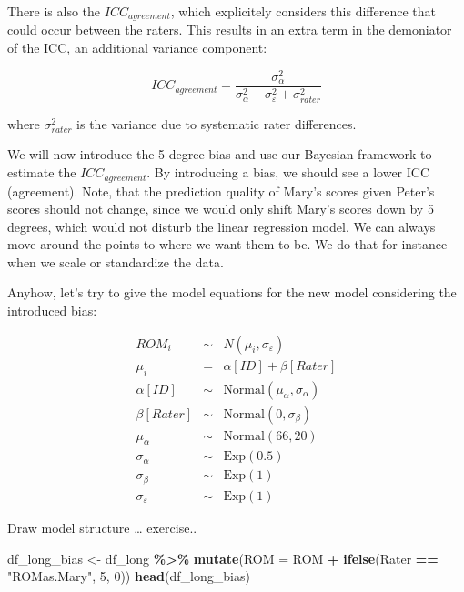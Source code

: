 \documentclass[
]{book}
\newenvironment{Shaded}{\begin{snugshade}}{\end{snugshade}}
\newcommand{\AttributeTok}[1]{\textcolor[rgb]{0.13,0.29,0.53}{#1}}
\newcommand{\DecValTok}[1]{\textcolor[rgb]{0.00,0.00,0.81}{#1}}
\newcommand{\FunctionTok}[1]{\textcolor[rgb]{0.13,0.29,0.53}{\textbf{#1}}}
\newcommand{\NormalTok}[1]{#1}
\newcommand{\OtherTok}[1]{\textcolor[rgb]{0.56,0.35,0.01}{#1}}
\newcommand{\SpecialCharTok}[1]{\textcolor[rgb]{0.81,0.36,0.00}{\textbf{#1}}}
\newcommand{\StringTok}[1]{\textcolor[rgb]{0.31,0.60,0.02}{#1}}
\begin{document}
There is also the \textbf{\(ICC_{agreement}\)}, which explicitely considers this difference
that could occur between the raters. This results in an extra term in the demoniator
of the ICC, an additional variance component:

\[ ICC_{agreement} = \frac{\sigma_{\alpha}^2}{\sigma_{\alpha}^2 + 
\sigma_{\varepsilon}^2 + \sigma_{rater}^2}\]

where \(\sigma_{rater}^2\) is the variance due to systematic rater differences.

We will now introduce the 5 degree bias and use our Bayesian
framework to estimate the \(ICC_{agreement}\). By introducing a bias, we should see
a lower ICC (agreement). Note, that the prediction quality of Mary's scores
given Peter's scores should not change, since we would only shift Mary's scores
down by 5 degrees, which would not disturb the linear regression model. We can
always move around the points to where we want them to be. We do that for instance
when we scale or standardize the data.

Anyhow, let's try to give the model equations for the new model considering
the introduced bias:

\[
\begin{array}{rcl}
ROM_i &\sim& N(\mu_i, \sigma_{\varepsilon}) \\
\mu_i &=& \alpha[ID] + \beta[Rater] \\
\alpha[ID] &\sim& \text{Normal}(\mu_{\alpha}, \sigma_{\alpha}) \\
\beta[Rater] &\sim& \text{Normal}(0, \sigma_{\beta}) \\
\mu_{\alpha} &\sim& \text{Normal}(66, 20) \\
\sigma_{\alpha} &\sim& \text{Exp}(0.5) \\
\sigma_{\beta} &\sim& \text{Exp}(1) \\
\sigma_{\varepsilon} &\sim& \text{Exp}(1)
\end{array}
\]

Draw model structure \ldots{} exercise..

\begin{Shaded}
\begin{Highlighting}[]
\NormalTok{df\_long\_bias }\OtherTok{\textless{}{-}}\NormalTok{ df\_long }\SpecialCharTok{\%\textgreater{}\%}
  \FunctionTok{mutate}\NormalTok{(}\AttributeTok{ROM =}\NormalTok{ ROM }\SpecialCharTok{+} \FunctionTok{ifelse}\NormalTok{(Rater }\SpecialCharTok{==} \StringTok{"ROMas.Mary"}\NormalTok{, }\DecValTok{5}\NormalTok{, }\DecValTok{0}\NormalTok{))}
\FunctionTok{head}\NormalTok{(df\_long\_bias)}
\end{Highlighting}
\end{Shaded}
\end{document}
